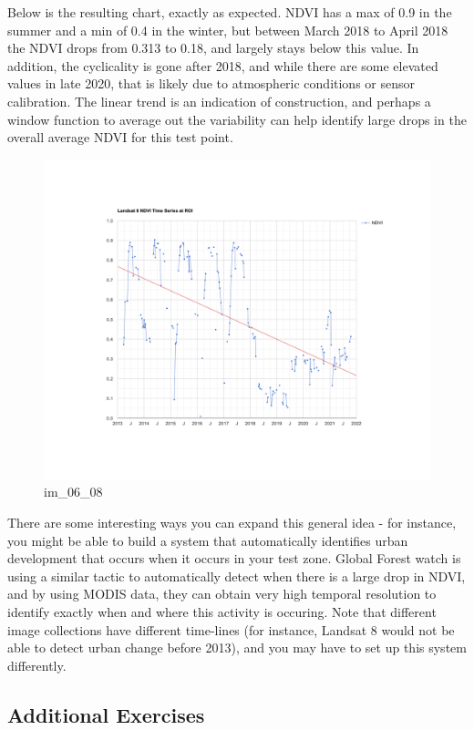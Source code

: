 \documentclass[
]{article}
\begin{document}
Below is the resulting chart, exactly as expected. NDVI has a max of 0.9 in the summer and a min of 0.4 in the winter, but between March 2018 to April 2018 the NDVI drops from 0.313 to 0.18, and largely stays below this value. In addition, the cyclicality is gone after 2018, and while there are some elevated values in late 2020, that is likely due to atmospheric conditions or sensor calibration. The linear trend is an indication of construction, and perhaps a window function to average out the variability can help identify large drops in the overall average NDVI for this test point.

\begin{figure}
\centering
\includegraphics{./im/im_06_08.png}
\caption{im\_06\_08}
\end{figure}

There are some interesting ways you can expand this general idea - for instance, you might be able to build a system that automatically identifies urban development that occurs when it occurs in your test zone. Global Forest watch is using a similar tactic to automatically detect when there is a large drop in NDVI, and by using MODIS data, they can obtain very high temporal resolution to identify exactly when and where this activity is occuring. Note that different image collections have different time-lines (for instance, Landsat 8 would not be able to detect urban change before 2013), and you may have to set up this system differently.

\hypertarget{additional-exercises-3}{%
\subsection{Additional Exercises}\label{additional-exercises-3}}
\end{document}
